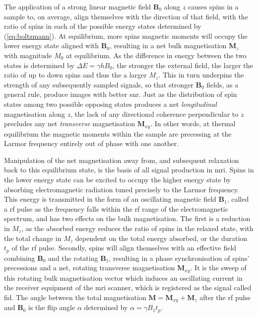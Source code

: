 The application of a strong linear magnetic field $\mathbf{B}_0$ along $z$ causes spins in a sample to, on average, align themselves with the direction of that field, with the ratio of spins in each of the possible energy states determined by (\ref{eq:boltzmann}).
At equilibrium, more spins magnetic moments will occupy the lower energy state aligned with $\mathbf{B}_0$, resulting in a net bulk magnetisation $\mathbf{M}_z$ with magnitude $M_0$ at equilibrium.
As the difference in energy between the two states is determined by $\Delta E = \gamma h B_0$, the stronger the external field, the larger the ratio of up to down spins and thus the a larger $M_z$.
This in turn underpins the strength of any subsequently sampled signals, so that stronger $\mathbf{B}_0$ fields, as a general rule, produce images with better \gls{snr}.
Just as the distribution of spin states among two possible opposing states produces a net \textit{longitudinal} magnetisation along $z$, the lack of any directional coherence perpendicular to $z$ precludes any net \textit{transverse} magnetisation $\mathbf{M}_{xy}$.
In other words, at thermal equilibrium the magnetic moments within the sample are precessing at the Larmor frequency entirely out of phase with one another.

Manipulation of the net magnetisation away from, and subsequent relaxation back to this equilibrium state, is the basis of all signal production in \gls{mri}.
Spins in the lower energy state can be excited to occupy the higher energy state by absorbing electromagnetic radiation tuned precisely to the Larmor frequency.
This energy is transmitted in the form of an oscillating magnetic field $\mathbf{B}_1$, called a \gls{rf} pulse as the frequency falls within the \gls{rf} range of the electromagnetic spectrum, and has two effects on the bulk magnetisation.
The first is a reduction in $M_z$, as the absorbed energy reduces the ratio of spins in the relaxed state, with the total change in $M_z$ dependent on the total energy absorbed, or the duration $t_p$ of the \gls{rf} pulse.
Secondly, spins will align themselves with an effective field combining $\mathbf{B}_0$ and the rotating $\mathbf{B}_1$, resulting in a phase synchronisation of spins' precessions and a net, rotating transverse magnetisation $\mathbf{M}_{xy}$.
It is the sweep of this rotating bulk magnetisation vector which induces an oscillating current in the receiver equipment of the \gls{mri} scanner, which is registered as the signal called \gls{fid}.
The angle between the total magnetisation $\mathbf{M} = \mathbf{M}_{xy} + \mathbf{M}_{z}$ after the \gls{rf} pulse and $\mathbf{B}_0$ is the flip angle $\alpha$ determined by $\alpha = \gamma B_1 t_p$.

